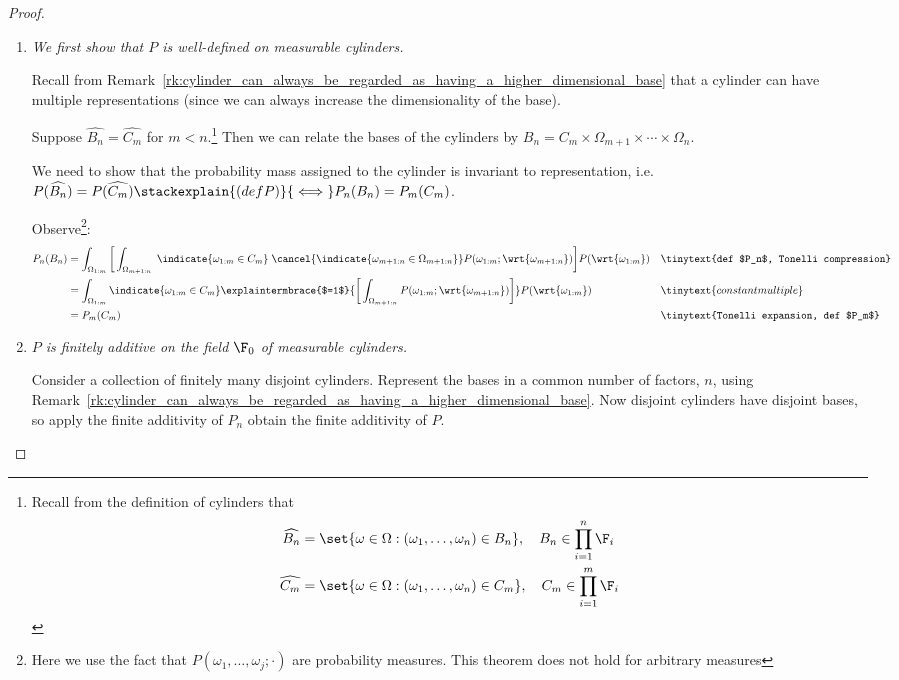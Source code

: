 \documentclass{article} %
\newcommand{\cylinder}[1]{\widehat{#1}}
\begin{document}
\begin{proof}
\begin{enumerate}
\item \textit{We first show that $P$ is well-defined on measurable cylinders.}

Recall from Remark~\ref{rk:cylinder_can_always_be_regarded_as_having_a_higher_dimensional_base} that a cylinder can have multiple representations (since we can always increase the dimensionality of the base).  

Suppose $\cylinder{B_n}=\cylinder{C_m}$ for $m<n$.\footnote{Recall from the definition of cylinders that 
\begin{align*}
 \cylinder{B_n} &= \set{\omega \in \Omega : (\omega_1, \hdots, \omega_n) \in B_n}, \quad B_n \in \prod_{i=1}^n \F_i \\
 \cylinder{C_m} &= \set{\omega \in \Omega : (\omega_1, \hdots, \omega_n) \in  C_m}, \quad  C_m \in \prod_{i=1}^m \F_i 
\end{align*}
} Then we can relate the bases of the cylinders by $B_n = C_m \times \Omega_{m+1} \times \cdots \times \Omega_n$.

We need to show that the probability mass assigned to the cylinder is invariant to representation, i.e. $P(\cylinder{B_n})=P(\cylinder{C_m}) \stackexplain{(def P)}{\iff} P_n(B_n)=P_m(C_m)$. 

Observe\footnote{Here we use the fact that $P(\omega_1, \hdots, \omega_j; \cdot)$ are probability measures.  This theorem does not hold for arbitrary measures}:
\begin{align*}
P_n(B_n) &= \int_{\Omega_{1:m}}  \bigg[ \int_{\Omega_{m+1:n}}   \; \indicate{\omega_{1:m} \in C_m} \; \cancel{\indicate{\omega_{m+1:n} \in \Omega_{m+1:n}}} P(\omega_{1:m}; \wrt{\omega_{m+1:n}}) \bigg]  P(\wrt{\omega_{1:m}}) && \tinytext{def $P_n$, Tonelli compression} \\
&= \int_{\Omega_{1:m}}  \indicate{\omega_{1:m} \in C_m} \explaintermbrace{$=1$}{\bigg[ \int_{\Omega_{m+1:n}}   P(\omega_{1:m}; \wrt{\omega_{m+1:n}}) \bigg]}  P(\wrt{\omega_{1:m}}) && \tinytext{constant multiple} \\
&= P_m(C_m) && \tinytext{Tonelli expansion, def $P_m$} 
\end{align*}

\item \textit{$P$ is finitely additive on the field $\F_0$ of measurable cylinders.}

Consider a collection of finitely many disjoint cylinders.  Represent the bases in a common number of factors, $n$, using Remark~\ref{rk:cylinder_can_always_be_regarded_as_having_a_higher_dimensional_base}.  Now disjoint cylinders have disjoint bases, so apply the finite additivity of $P_n$ obtain the finite additivity of $P$.


\end{enumerate}
\end{proof}
\end{document}
